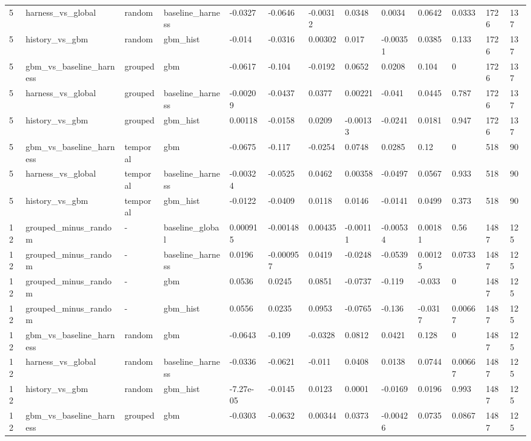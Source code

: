 \begin{tabular}{lllllllllllll}
5 & harness\_vs\_global & random & baseline\_harness & -0.0327 & -0.0646 & -0.00312 & 0.0348 & 0.0034 & 0.0642 & 0.0333 & 1726 & 137 \\
5 & history\_vs\_gbm & random & gbm\_hist & -0.014 & -0.0316 & 0.00302 & 0.017 & -0.00351 & 0.0385 & 0.133 & 1726 & 137 \\
5 & gbm\_vs\_baseline\_harness & grouped & gbm & -0.0617 & -0.104 & -0.0192 & 0.0652 & 0.0208 & 0.104 & 0 & 1726 & 137 \\
5 & harness\_vs\_global & grouped & baseline\_harness & -0.00209 & -0.0437 & 0.0377 & 0.00221 & -0.041 & 0.0445 & 0.787 & 1726 & 137 \\
5 & history\_vs\_gbm & grouped & gbm\_hist & 0.00118 & -0.0158 & 0.0209 & -0.00133 & -0.0241 & 0.0181 & 0.947 & 1726 & 137 \\
5 & gbm\_vs\_baseline\_harness & temporal & gbm & -0.0675 & -0.117 & -0.0254 & 0.0748 & 0.0285 & 0.12 & 0 & 518 & 90 \\
5 & harness\_vs\_global & temporal & baseline\_harness & -0.00324 & -0.0525 & 0.0462 & 0.00358 & -0.0497 & 0.0567 & 0.933 & 518 & 90 \\
5 & history\_vs\_gbm & temporal & gbm\_hist & -0.0122 & -0.0409 & 0.0118 & 0.0146 & -0.0141 & 0.0499 & 0.373 & 518 & 90 \\
12 & grouped\_minus\_random & - & baseline\_global & 0.000915 & -0.00148 & 0.00435 & -0.00111 & -0.00534 & 0.00181 & 0.56 & 1487 & 125 \\
12 & grouped\_minus\_random & - & baseline\_harness & 0.0196 & -0.000957 & 0.0419 & -0.0248 & -0.0539 & 0.00125 & 0.0733 & 1487 & 125 \\
12 & grouped\_minus\_random & - & gbm & 0.0536 & 0.0245 & 0.0851 & -0.0737 & -0.119 & -0.033 & 0 & 1487 & 125 \\
12 & grouped\_minus\_random & - & gbm\_hist & 0.0556 & 0.0235 & 0.0953 & -0.0765 & -0.136 & -0.0317 & 0.00667 & 1487 & 125 \\
12 & gbm\_vs\_baseline\_harness & random & gbm & -0.0643 & -0.109 & -0.0328 & 0.0812 & 0.0421 & 0.128 & 0 & 1487 & 125 \\
12 & harness\_vs\_global & random & baseline\_harness & -0.0336 & -0.0621 & -0.011 & 0.0408 & 0.0138 & 0.0744 & 0.00667 & 1487 & 125 \\
12 & history\_vs\_gbm & random & gbm\_hist & -7.27e-05 & -0.0145 & 0.0123 & 0.0001 & -0.0169 & 0.0196 & 0.993 & 1487 & 125 \\
12 & gbm\_vs\_baseline\_harness & grouped & gbm & -0.0303 & -0.0632 & 0.00344 & 0.0373 & -0.00426 & 0.0735 & 0.0867 & 1487 & 125 \\

\end{tabular}
